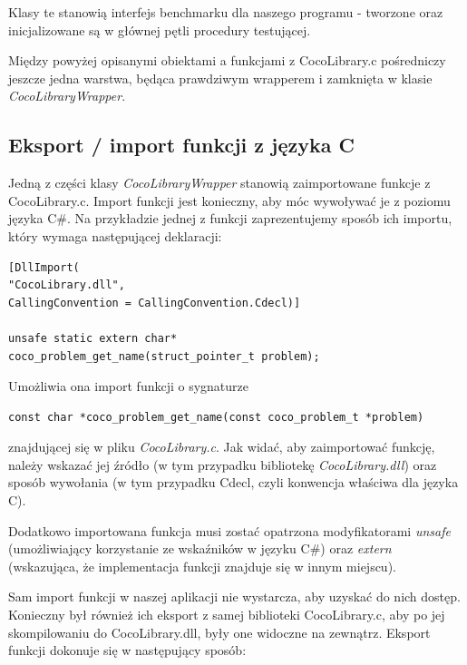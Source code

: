 \documentclass[12pt, twoside, openany, abstract=on]{report}
\theoremstyle{definition}
\begin{document}
Klasy te stanowią interfejs benchmarku dla naszego programu - tworzone oraz inicjalizowane są w głównej pętli procedury testującej.

Między powyżej opisanymi obiektami a funkcjami z CocoLibrary.c pośredniczy jeszcze jedna warstwa, będąca prawdziwym wrapperem i zamknięta w klasie \textit{CocoLibraryWrapper}.

\subsection{Eksport / import funkcji z języka C}

Jedną z części klasy \textit{CocoLibraryWrapper} stanowią zaimportowane funkcje z CocoLibrary.c. Import funkcji jest konieczny, aby móc wywoływać je z poziomu języka C\#. Na przykładzie jednej z funkcji zaprezentujemy sposób ich importu, który wymaga następującej deklaracji:\\

\begin{lstlisting}[frame=single]
[DllImport(
"CocoLibrary.dll", 
CallingConvention = CallingConvention.Cdecl)]

unsafe static extern char* 
coco_problem_get_name(struct_pointer_t problem);
\end{lstlisting}

Umożliwia ona import funkcji o sygnaturze

\begin{lstlisting}[frame=single]
const char *coco_problem_get_name(const coco_problem_t *problem)
\end{lstlisting}

znajdującej się w pliku \textit{CocoLibrary.c}. Jak widać, aby zaimportować funkcję, należy wskazać jej źródło (w tym przypadku bibliotekę \textit{CocoLibrary.dll}) oraz sposób wywołania (w tym przypadku Cdecl, czyli konwencja właściwa dla języka C). 

Dodatkowo importowana funkcja musi zostać opatrzona modyfikatorami \textit{unsafe} (umożliwiający korzystanie ze wskaźników w języku C\#) oraz \textit{extern} (wskazująca, że implementacja funkcji znajduje się w innym miejscu).

Sam import funkcji w naszej aplikacji nie wystarcza, aby uzyskać do nich dostęp. Konieczny był również ich eksport z samej biblioteki CocoLibrary.c, aby po jej skompilowaniu do CocoLibrary.dll, były one widoczne na zewnątrz. Eksport funkcji dokonuje się w następujący sposób:\\
\end{document}
